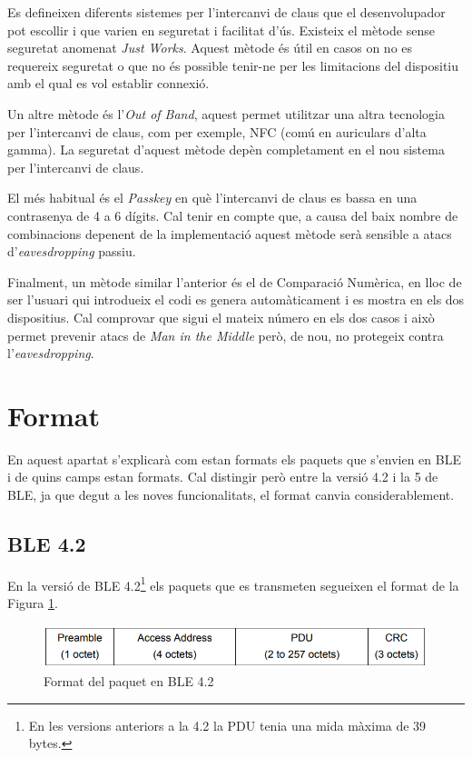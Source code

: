 Es defineixen diferents sistemes per l'intercanvi de claus que el desenvolupador pot escollir i que varien en seguretat i facilitat d'ús.
Existeix el mètode sense seguretat anomenat \textit{Just Works}.
Aquest mètode és útil en casos on no es requereix seguretat o que no és possible tenir-ne per les limitacions del dispositiu amb el qual es vol establir connexió.

Un altre mètode és l'\textit{Out of Band}, aquest permet utilitzar una altra tecnologia per l'intercanvi de claus, com per exemple, NFC (comú en auriculars d'alta gamma).
La seguretat d'aquest mètode depèn completament en el nou sistema per l'intercanvi de claus.

El més habitual és el \textit{Passkey} en què l'intercanvi de claus es bassa en una contrasenya de 4 a 6 dígits.
Cal tenir en compte que, a causa del baix nombre de combinacions depenent de la implementació aquest mètode serà sensible a atacs d'\textit{eavesdropping} passiu.

Finalment, un mètode similar l'anterior és el de Comparació Numèrica, en lloc de ser l'usuari qui introdueix el codi es genera automàticament i es mostra en els dos dispositius.
Cal comprovar que sigui el mateix número en els dos casos i això permet prevenir atacs de \textit{Man in the Middle} però, de nou, no protegeix contra l'\textit{eavesdropping}.


\section{Format}
\label{sec:format}
En aquest apartat s'explicarà com estan formats els paquets que s'envien en BLE i de quins camps estan formats.
Cal distingir però entre la versió 4.2 i la 5 de BLE, ja que degut a les noves funcionalitats, el format canvia considerablement.

\subsection{BLE 4.2}
En la versió de BLE 4.2\footnote{En les versions anteriors a la 4.2 la PDU tenia una mida màxima de 39 bytes.} els paquets que es transmeten segueixen el format de la Figura \ref{fig:4_2_format}.

\begin{figure}[!h]
	\begin{center}
		\includegraphics[width=1\textwidth]{./images/Packet_format_4_2.png}
		\caption{Format del paquet en BLE 4.2 \cite{BLE_4.2_packet_format}}
		\label{fig:4_2_format}
	\end{center}
\end{figure}

